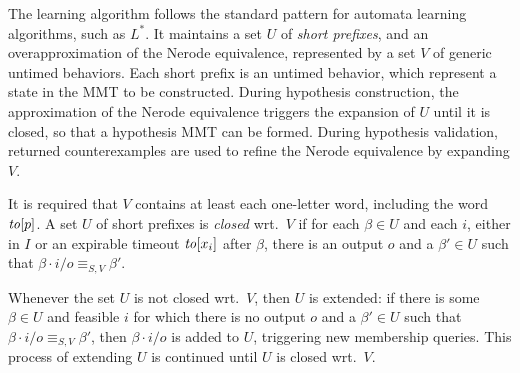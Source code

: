 The learning algorithm follows the standard pattern for automata learning
algorithms, such as $L^*$. It maintains
a set $U$ of {\em short prefixes}, and
  an overapproximation of the Nerode equivalence,
  represented by a set $V$ of generic untimed behaviors.
  Each short prefix is an untimed
behavior, which represent a state in the MMT to be constructed.
During hypothesis construction,
the approximation of the Nerode equivalence triggers the expansion of
$U$ until it is closed, so that a hypothesis MMT can be formed.
During hypothesis validation, returned counterexamples are used to refine
the Nerode equivalence by expanding $V$.

It is required that $V$ contains at least each one-letter word, including
the word $\mathit{to}[p]$.
A set $U$ of short prefixes is {\em closed} wrt.\ $V$ if 
  for each $\beta \in U$ and each
  $i$, either in $I$ or an expirable timeout $\mathit{to}[x_i]$ after $\beta$,
  there is an output $o$ and a $\beta' \in U$ such that
  $\beta \cdot i/o \equiv_{S,V} \beta'$.

Whenever the set $U$ is not closed wrt.\ $V$, then $U$ is extended:
if there is some $\beta \in U$ and feasible $i$ 
for which there is no
output $o$ and a $\beta' \in U$ such that
$\beta \cdot i/o \equiv_{S,V} \beta'$, 
then $\beta \cdot i/o$ is added to $U$, triggering new membership queries.
This process of extending $U$ is continued until $U$ is closed wrt.\ $V$.

